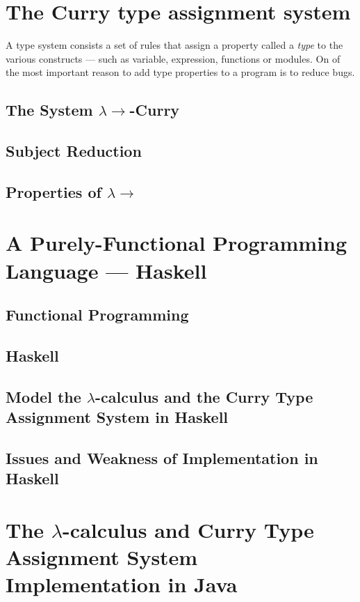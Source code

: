 \documentclass[a4paper,11pt,twoside]{report}
\begin{document}
\chapter{The Curry type assignment system}

A type system consists a set of rules that assign a property called a \textit{type} to the various constructs --- such as variable, expression, functions or modules. On of the most important reason to add type properties to a program is to reduce bugs. 



\section{The System $\lambda \rightarrow $-Curry}
\section{Subject Reduction}
\section{Properties of $\lambda \rightarrow $}

\chapter{A Purely-Functional Programming Language --- Haskell}

\section{Functional Programming}
\section{Haskell}
\section{Model the $\lambda$-calculus and the Curry Type Assignment System in Haskell}
\section{Issues and Weakness of Implementation in Haskell }


\chapter{The $\lambda$-calculus and Curry Type Assignment System Implementation in Java}
\end{document}
